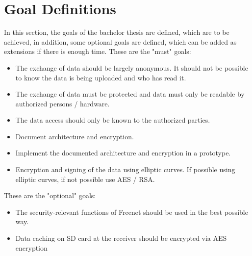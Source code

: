 \section{Goal Definitions}
In this section, the goals of the bachelor thesis are defined, which are to be achieved, in addition, some optional goals are defined, which can be added as extensions if there is enough time. 
These are the "must" goals:
\begin{description}
\begin{itemize}
\item
The exchange of data should be largely anonymous. It should not be possible to know the data is being uploaded and who has read it. 
\item
The exchange of data must be protected and data must only be readable by authorized persons / hardware.  
\item
The data access should only be known to the authorized parties.  
\item
Document architecture and encryption.
\item
Implement the documented architecture and encryption in a prototype.
\item
Encryption and signing of the data using elliptic curves. If possible using elliptic curves, if not possible use AES / RSA.
\end{itemize}
\end{description}
\newline
These are the "optional" goals:
\begin{description}
\begin{itemize}
\item
The security-relevant functions of Freenet should be used in the best possible way. 
\item 
Data caching on SD card at the receiver should be encrypted via AES encryption
\end{itemize}
\end{description}